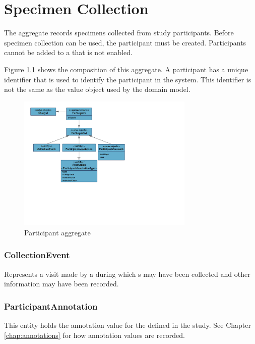 \chapter{Specimen Collection}

The  aggregate records specimens collected
from study participants. Before specimen collection can be used, the
participant must be created. Participants cannot be added to a
 that is not enabled.

Figure \ref{fig:participant-aggregate} shows the composition of this aggregate.
A participant has a unique identifier that is used to identify the participant
in the system. This identifier is not the same as the
 value object used by the domain model.

\begin{figure}[H]
  \centering
  \includegraphics[trim={10mm 75mm 102mm 10mm}, clip,
    width=0.75\textwidth]{images/participant-aggregate}
  \caption{Participant aggregate}
  \label{fig:participant-aggregate}
\end{figure}

\subsection*{CollectionEvent}
Represents a visit made by a  during which
s may have been collected and other information may have
been recorded.

\subsection*{ParticipantAnnotation}
This entity holds the annotation value for the
 defined in the study. See Chapter
\ref{chap:annotations} for how annotation values are recorded.

